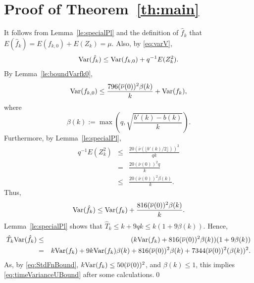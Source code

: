 \documentclass[a4paper,11pt]{article}
\begin{document}
\section{Proof of Theorem~\ref{th:main}}        
It follows from Lemma~\ref{le:specialPl}  and the definition of \(\hat f_{k}\) that \(E(\hat f_{k})=E(f_{k,0})+E(Z_{k})=\mu\). Also, by \eqref{eq:varV},\begin{equation*}
{\rm Var}(\hat f_{k})\le{\rm Var}(f_{k,0}) +q^{-1}E(Z_{k}^{2}).
\end{equation*}
By Lemma~\ref{le:boundVarfk0}, \begin{displaymath}
{\rm Var}(f_{k,0})\leq\frac{796({\overline\nu}(0))^{2}\beta(k)}{k}+{\rm Var}(f_{k}),
\end{displaymath}
where
\begin{displaymath}
\beta(k):=\max\left(q,\sqrt{\frac{b'(k)-b(k)}{k}}\right).
\end{displaymath}Furthermore,
by Lemma~\ref{le:specialPl}, \begin{eqnarray*}
q^{-1}E(Z_{k}^{2})&\le&\frac{20(\overline{\nu}(\lfloor{b'(k)}/{2}\rfloor))^{2}}{qk}
\\&=&\frac{20( \overline{\nu}(0))^{2} q}{k}\\
&\le&\frac{20( \overline{\nu}(0))^{2}\beta(k)}{k}.
\end{eqnarray*}
Thus, \begin{equation*}
{\rm Var}(\hat f_{k})\leq{\rm Var}(f_{k})+ \frac{816({\overline\nu}(0))^{2}\beta(k)}{k}.
\end{equation*}
Lemma~\ref{le:specialPl} shows that  \(\hat T_{k}\le k+9qk\leq k(1+9\beta(k))\).  Hence,
 \begin{eqnarray*}
 \hat T_{k}{\rm Var}(\hat f_{k})
 &\leq& (k{\rm Var}(f_{k})+816({\overline\nu}(0))^{2}\beta(k))(1+9\beta(k))\\
&=& k{\rm Var}(f_{k})+9k{\rm Var}(f_{k})\beta(k)+816({\overline\nu}(0))^{2}\beta(k)+7344({\overline\nu}(0))^{2}(\beta(k))^{2}.
  \end{eqnarray*} 
As, by \eqref{eq:StdFnBound}, \(k{\rm Var}(f_{k})\le50({\overline\nu}(0))^{2}\), and  \(\beta(k)\leq1\), this implies \eqref{eq:timeVarianceUBound} after some calculations.\qed
\end{document}

